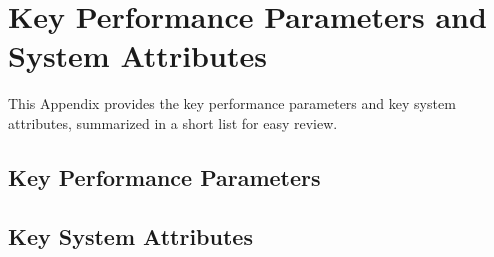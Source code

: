 
\chapter{Key Performance Parameters and System Attributes}
\label{loc:Bspec}

This Appendix provides the key performance parameters and key system attributes, summarized in a short list for easy review.

\KNEADSECTIONNEWPAGE
\section{Key Performance Parameters}
\label{lab:sec_Bspec_KPP}



\newpage
\section{Key System Attributes}
\label{lab:sec_Bspec_KSA}

